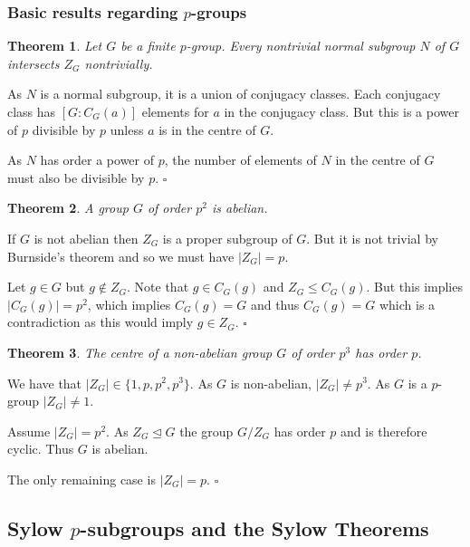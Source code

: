 \documentclass[10pt]{article}
\newtheorem{theorem}{Theorem}[section]
\newenvironment{proof}[1][Proof]{\begin{trivlist}
\item[\hskip \labelsep {\itshape #1}]}{\end{trivlist}}
\begin{document}
\subsubsection{Basic results regarding $p$-groups}

\begin{theorem}
Let $G$ be a finite $p$-group. Every nontrivial normal subgroup $N$ of $G$ intersects $Z_G$ nontrivially.
\end{theorem}

\begin{proof}
As $N$ is a normal subgroup, it is a union of conjugacy classes. Each conjugacy class has $[G:C_G(a)]$ elements for $a$ in the conjugacy class. But this is a power of $p$ divisible by $p$ unless $a$ is in the centre of $G$.

As $N$ has order a power of $p$, the number of elements of $N$ in the centre of $G$ must also be divisible by $p$. $\square$
\end{proof}

\begin{theorem}
A group $G$ of order $p^2$ is abelian.
\end{theorem}

\begin{proof}
If $G$ is not abelian then $Z_G$ is a proper subgroup of $G$. But it is not trivial by Burnside's theorem and so we must have $|Z_G| = p$.

Let $g \in G$ but $g \notin Z_G$. Note that $g \in C_G(g)$ and $Z_G \leq C_G(g)$. But this implies $|C_G(g)| = p^2$, which implies $C_G(g) = G$ and thus $C_G(g) = G$ which is a contradiction as this would imply $g \in Z_G$. $\square$
\end{proof}

\begin{theorem}
The centre of a non-abelian group $G$ of order $p^3$ has order $p$.
\end{theorem}

\begin{proof}
We have that $|Z_G| \in \{1, p, p^2, p^3\}$. As $G$ is non-abelian, $|Z_G| \neq p^3$. As $G$ is a $p$-group $|Z_G| \neq 1$.

Assume $|Z_G| = p^2$. As $Z_G \mathrel{\unlhd} G$ the group $G/Z_G$ has order $p$ and is therefore cyclic. Thus $G$ is abelian.

The only remaining case is $|Z_G| = p$. $\square$
\end{proof}

\subsection{Sylow $p$-subgroups and the Sylow Theorems}
\end{document}
